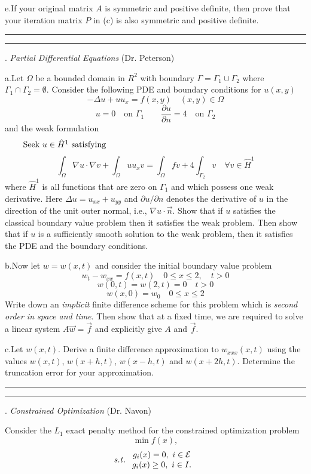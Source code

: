 \documentclass [11point]{article}
\begin{document}
e.\quad  If your original matrix $A$ is symmetric and positive definite, then prove that your iteration matrix $P$ in (c) is also symmetric and positive definite.  

\bigskip
\hrule \medskip


\pagebreak
\hrule 
{}. \textit{Partial Differential Equations} (Dr. Peterson)
\bigskip

a.\quad  Let $\Omega$ be a bounded domain in $R^2$ with boundary $\Gamma = \Gamma_1 \cup \Gamma_2$ where $\Gamma_1 \cap \Gamma_2=\emptyset$.  Consider the following  PDE and boundary conditions for $u(x,y )$
$$-\Delta u +uu_x = f(x,y)  \quad (x,y) \in \Omega$$
$$ u=0 \quad \mbox{on $\Gamma_1$} \qquad \frac{\partial u}{\partial n} = 4 \quad \mbox{on $\Gamma_2$}$$
and the weak formulation
$$ \mbox{Seek $u \in \hat H^1$ satisfying} \hskip3in $$
$$ \int_\Omega \nabla u \cdot \nabla v + \int_\Omega u u_x v = \int_\Omega f v +4\int_{\Gamma_2} v \quad \forall v \in \hat H^1$$
where $\hat H^1$ is all functions that are zero on $\Gamma_1$ and which possess one weak derivative.  Here $\Delta u = u_{xx}+u_{yy}$ and $\partial u/\partial n$ denotes the derivative of $u$ in the direction of the unit outer normal, i.e., $\nabla u \cdot \vec n$.    \smallskip
Show that if $u$ satisfies the classical boundary value problem then it satisfies the weak problem.  Then show that if $u$ is a sufficiently smooth solution to the weak problem, then it satisfies the PDE and the boundary conditions. \medskip

 
b.\quad  Now let $w=w(x,t)$ and consider the initial boundary value problem
$$ w_t - w_{xx} = f(x,t) \quad 0 \le x \le 2, \quad t>0 $$
$$ w(0,t)=w(2,t) = 0 \quad t>0 $$
$$ w(x,0) = w_0 \quad  0 \le x \le 2$$
Write down an {\it implicit}   finite difference scheme for this problem which is {\it second order in space and time}.  Then show that at a fixed time, we are required to solve a linear system $A \vec w = \vec f$ and explicitly give $A$ and $\vec f$.  
\medskip

c.\quad Let $w(x,t)$.  Derive a finite difference approximation to $w_{xxx}(x,t)$ using the values $w(x,t)$, $w(x+h,t)$, $w(x-h,t)$ and $w(x+2h,t)$.  Determine the truncation error for your approximation.  

\bigskip
\hrule 

\pagebreak
\hrule 
{}. \textit{Constrained Optimization} (Dr. Navon)
\bigskip

Consider the $L_1$ exact penalty method for the constrained optimization  problem
$$ \min f(x),$$
$${\it s.t. }
\left. \begin{array}{c}
    g_i(x)=0,~i\in {\cal E} \\g_i(x)\geq 0, ~i\in I.  \end{array} \right.$$
\end{document}
